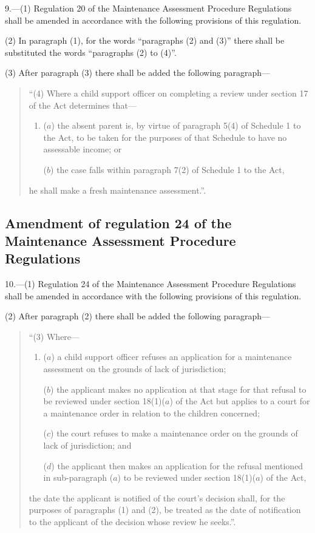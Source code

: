 \documentclass[a4paper]{article}
\begin{document}
9.—(1) Regulation 20 of the Maintenance Assessment Procedure Regulations shall be amended in accordance with the following provisions of this regulation.

(2) In paragraph (1), for the words “paragraphs (2) and (3)” there shall be substituted the words “paragraphs (2) to (4)”.

(3) After paragraph (3) there shall be added the following paragraph---
\begin{quotation}
“(4) Where a child support officer on completing a review under section 17 of the Act determines that---
\begin{enumerate}\item[]
($a$) the absent parent is, by virtue of paragraph 5(4) of Schedule 1 to the Act, to be taken for the purposes of that Schedule to have no assessable income; or

($b$) the case falls within paragraph 7(2) of Schedule 1 to the Act,
\end{enumerate}
he shall make a fresh maintenance assessment.”.
\end{quotation}

\subsection[10. Amendment of regulation 24 of the Maintenance Assessment Procedure Regulations]{Amendment of regulation 24 of the Maintenance Assessment Procedure Regulations}

10.—(1) Regulation 24 of the Maintenance Assessment Procedure Regulations shall be amended in accordance with the following provisions of this regulation.

(2) After paragraph (2) there shall be added the following paragraph---
\begin{quotation}
“(3) Where---
\begin{enumerate}\item[]
($a$) a child support officer refuses an application for a maintenance assessment on the grounds of lack of jurisdiction;

($b$) the applicant makes no application at that stage for that refusal to be reviewed under section 18(1)($a$) of the Act but applies to a court for a maintenance order in relation to the children concerned;

($c$) the court refuses to make a maintenance order on the grounds of lack of jurisdiction; and

($d$) the applicant then makes an application for the refusal mentioned in sub-paragraph ($a$) to be reviewed under section 18(1)($a$) of the Act,
\end{enumerate}
the date the applicant is notified of the court’s decision shall, for the purposes of paragraphs (1) and (2), be treated as the date of notification to the applicant of the decision whose review he seeks.”.
\end{quotation}
\end{document}

